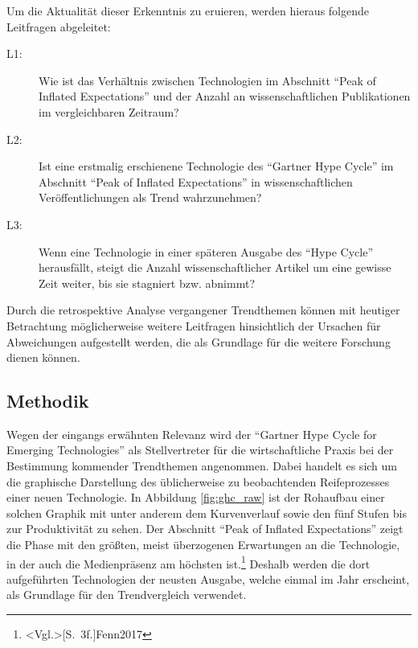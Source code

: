 Um die Aktualität dieser Erkenntnis zu eruieren, werden hieraus folgende Leitfragen abgeleitet:

\begin{description}
	\item[L1:] Wie ist das Verhältnis zwischen Technologien im Abschnitt "`Peak of Inflated Expectations"' und der Anzahl an wissenschaftlichen Publikationen im vergleichbaren Zeitraum?
\end{description}

\begin{description}
	\item[L2:] Ist eine erstmalig erschienene Technologie des "`Gartner Hype Cycle"' im Ab\-schnitt "`Peak of Inflated Expectations"' in wissen\-schaftlichen Ver\-öf\-fent\-lichungen als Trend wahrzunehmen?
\end{description}

\begin{description}
	\item[L3:] Wenn eine Technologie in einer späteren Ausgabe des "`Hype Cycle"' herausfällt, steigt die Anzahl wissenschaftlicher Artikel um eine gewisse Zeit weiter, bis sie stagniert bzw. abnimmt?
\end{description}

Durch die retrospektive Analyse vergangener Trendthemen können mit heutiger Betrachtung möglicherweise weitere Leitfragen hinsichtlich der Ursachen für Abweichungen aufgestellt werden, die als Grundlage für die weitere Forschung dienen können.

\subsection{Methodik}
Wegen der eingangs erwähnten Relevanz wird der "`Gartner Hype Cycle for Emerging Technologies"' als Stellvertreter für die wirtschaftliche Praxis bei der Bestimmung kommender Trendthemen angenommen. Dabei handelt es sich um die graphische Darstellung des üblicherweise zu beobachtenden Reifeprozesses einer neuen Technologie. In Abbildung \ref{fig:ghc_raw} ist der Rohaufbau einer solchen Graphik mit unter anderem dem Kurvenverlauf sowie den fünf Stufen bis zur Produktivität zu sehen. Der Abschnitt "`Peak of Inflated Expectations"' zeigt die Phase mit den größten, meist überzogenen Erwartungen an die Technologie, in der auch die Medienpräsenz am höchsten ist.\footnote{\citeNP<Vgl.>[S.~3f.]{Fenn2017}} Deshalb werden die dort aufgeführten Technologien der neusten Ausgabe, welche einmal im Jahr erscheint, als Grundlage für den Trendvergleich verwendet.

